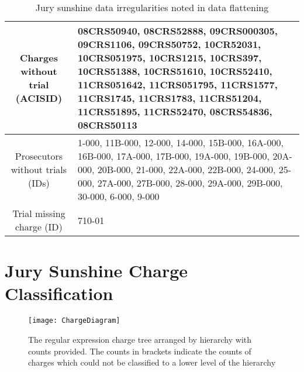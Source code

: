 \begin{table}[h]
  \caption[Jury Sunshine Irregularities]{Jury sunshine data irregularities noted in data flattening}
  \centering
  \begin{tabularx}{\textwidth}{|c|X|} \hline
    Charges without trial (ACISID) & 08CRS50940, 08CRS52888, 09CRS000305, 09CRS1106, 09CRS50752, 10CR52031, 10CRS051975,
    10CRS1215, 10CRS397, 10CRS51388, 10CRS51610, 10CRS52410, 11CRS051642, 11CRS051795, 11CRS1577, 11CRS1745, 11CRS1783,
    11CRS51204, 11CRS51895, 11CRS52470, 08CRS54836, 08CRS50113 \\ \hline 
    Prosecutors without trials (IDs) & 1-000, 11B-000, 12-000, 14-000, 15B-000, 16A-000,
                     16B-000, 17A-000, 17B-000, 19A-000, 19B-000,
                     20A-000, 20B-000, 21-000, 22A-000, 22B-000,
                     24-000, 25-000, 27A-000, 27B-000, 28-000,
                                       29A-000, 29B-000, 30-000, 6-000, 9-000 \\ \hline
    Trial missing charge (ID) & 710-01 \\ \hline
  \end{tabularx}
\end{table}

\section{Jury Sunshine Charge Classification} \label{app:charge}

\begin{figure}[!h]
  \centering
  \texttt{[image: ChargeDiagram]}
  \caption[Regular expression charge tree visualized]{The regular expression charge tree arranged by hierarchy with counts
    provided. The counts in brackets indicate the counts of charges which could not be classified to a lower level of the
    hierarchy}
  \label{fig:chargetree}
\end{figure}

